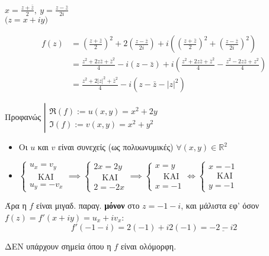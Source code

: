 \documentclass[12pt,a4paper,titlepage,fleqn]{article}
\begin{document}
	\begin{enumroman}
		\item \( x=\frac{z+\bar z}{2},\ y=\frac{z-\bar z }{2i} \) \\
		\( \big(z=x+iy\big) \)
		
		\begin{align*}
			f(z) &= \left(\frac{z+\bar z}{2}\right)^2+2\left(\frac{z-\bar z}{2i}\right)
			+i\left(\left(\frac{z+\bar z}{2}\right)^2+\left(\frac{z-\bar z}{2i}\right)^2\right)
			\\ &= \frac{z^2+2z\bar z+\bar z^2}{4}-
			i\left(z-\bar z\right)+i\left(\frac{z^2+2z\bar z+\bar z^2}{4}
			-\frac{z^2-2z\bar z+z^2}{4}\right)
			\\ &= \frac{z^2+2|z|^2+\bar z^2}{4}-i\left(
			z-\bar z-|z|^2
			\right)
		\end{align*}
		\item Προφανώς
		\( 
		\left|
		\begin{array}{l}
		\Re(f) := u(x,y) = x^2+2y \\
		\Im(f) := v(x,y) = x^2+y^2
		\end{array}
		 \right.
		 \)
		 \begin{itemize}
		 	\item Οι \( u \) και \( v \) είναι συνεχείς (ως πολυωνυμικές) \( \forall
		 	(x,y)\in\mathbb R^2
		 	 \)
		 	\item
		 	\( 
		 	\begin{cases}
		 	u_x=v_y \\ \quad\text{ΚΑΙ} \\ u_y=-v_x
		 	\end{cases} \implies \begin{cases}
		 	2x=2y\\ \quad\text{ΚΑΙ} \\ 2=-2x
		 	\end{cases} \implies \begin{cases}
		 	x=y \\ \quad \text{ΚΑΙ} \\ x = -1
		 	\end{cases} \iff \begin{cases}
		 	x=-1 \\ \quad\text{ΚΑΙ} \\ y=-1
		 	\end{cases}
		 	 \)
		 \end{itemize}
		 Άρα η \( f \) είναι μιγαδ. παραγ. \textbf{μόνον} στο \( \boxed{z=-1-i} \),
		 και μάλιστα εφ' όσον \( f(z)=f'(x+iy)=u_x+iv_x \):
		 \[
		 f'(-1-i) = 2(-1)+i2(-1) = \underline{-2-i2}
		 \]
		 \item ΔΕΝ υπάρχουν σημεία όπου η \( f \) είναι ολόμορφη.
	\end{enumroman}
	
\end{document}
